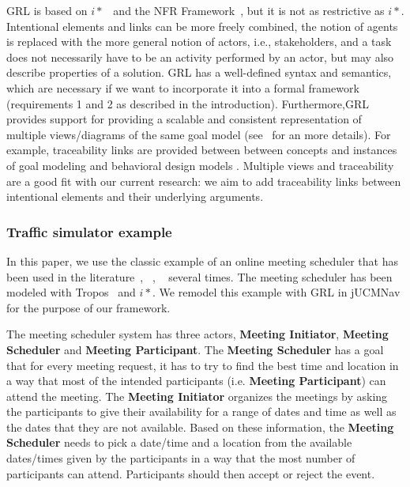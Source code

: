 GRL is based on $i*$~\cite{Yu:1997:TMR:827255.827807} and the NFR Framework~\cite{chung2012non}, but it is not as restrictive as $i*$. Intentional elements and links can be more freely combined, the notion of agents is replaced with the more general notion of actors, i.e., stakeholders, and a task does not necessarily have to be an activity performed by an actor, but may also describe properties of a solution. GRL has a well-defined syntax and semantics, which are necessary if we want to incorporate it into a formal framework (requirements 1 and 2 as described in the introduction). Furthermore,GRL provides support for providing a scalable and consistent representation of multiple views/diagrams of the same goal model (see~\cite[Ch.2]{Ghanavati2013} for an more details). For example, traceability links are provided between between concepts and instances of goal modeling and behavioral design models \cite{}. Multiple views and traceability are a good fit with our current research: we aim to add traceability links between intentional elements and their underlying arguments. 

\subsubsection{Traffic simulator example}
\label{sect:background:casestudy}

In this paper, we use the classic example of an online meeting scheduler that has been used in the literature~\cite{}, ~\cite{}, ~\cite{} several times. The meeting scheduler has been modeled with Tropos~\cite{} and $i*$. We remodel this example with GRL in jUCMNav for the purpose of our framework. 

The meeting scheduler system has three actors, \textbf{Meeting Initiator}, \textbf{Meeting Scheduler} and \textbf{Meeting Participant}. The \textbf{Meeting Scheduler} has a goal that for every meeting request, it has to try to find the best time and location in a way that most of the intended participants (i.e. \textbf{Meeting Participant}) can attend the meeting. The \textbf{Meeting Initiator} organizes the meetings by asking the participants to give their availability for a range of dates and time as well as the dates that they are not available. Based on these information, the \textbf{Meeting Scheduler} needs to pick a date/time and a location from the available dates/times given by the participants in a way that the most number of participants can attend. Participants should then accept or reject the event. 

